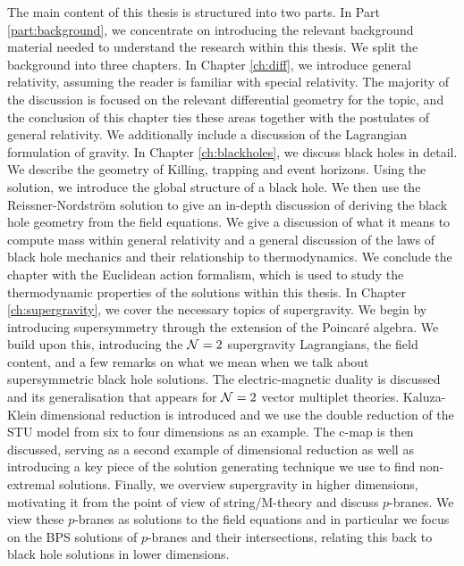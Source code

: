 The main content of this thesis is structured into two parts. In Part \ref{part:background}, we concentrate on introducing the relevant background material needed to understand the research within this thesis. We split the background into three chapters. In Chapter \ref{ch:diff}, we introduce general relativity, assuming the reader is familiar with special relativity. The majority of the discussion is focused on the relevant differential geometry for the topic, and the conclusion of this chapter ties these areas together with the postulates of general relativity. We additionally include a discussion of the Lagrangian formulation of gravity. In Chapter \ref{ch:blackholes}, we discuss black holes in detail. We describe the geometry of Killing, trapping and event horizons. Using the \sch solution, we introduce the global structure of a black hole. We then use the Reissner-Nordstr\"om solution to give an in-depth discussion of deriving the black hole geometry from the field equations. We give a discussion of what it means to compute mass within general relativity and a general discussion of the laws of black hole mechanics and their relationship to thermodynamics. We conclude the chapter with the Euclidean action formalism, which is used to study the thermodynamic properties of the solutions within this thesis. In Chapter \ref{ch:supergravity}, we cover the necessary topics of supergravity. We begin by introducing supersymmetry through the extension of the Poincar\'e algebra. We build upon this, introducing the ${\cal N} = 2$ supergravity Lagrangians, the field content, and a few remarks on what we mean when we talk about supersymmetric black hole solutions. The electric-magnetic duality is discussed and its generalisation that appears for ${\cal N} = 2$ vector multiplet theories. Kaluza-Klein dimensional reduction is introduced and we use the double reduction of the STU model from six to four dimensions as an example. The c-map is then discussed, serving as a second example of dimensional reduction as well as introducing a key piece of the solution generating technique we use to find non-extremal solutions. Finally, we overview supergravity in higher dimensions, motivating it from the point of view of string/M-theory and discuss $p$-branes. We view these $p$-branes as solutions to the field equations and in particular we focus on the BPS solutions of $p$-branes and their intersections, relating this back to black hole solutions in lower dimensions.


